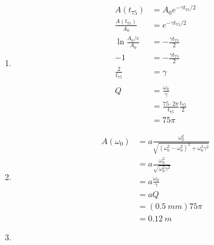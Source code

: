 \documentclass{article}
\begin{document}
\subsection{}

\begin{enumerate}
  \item

        \begin{align*}
          A(t_{75})               & = A_0 e^{-\gamma t_{75} / 2}                     \\
          \frac{A(t_{75})}{A_0}   & = e^{-\gamma t_{75} / 2}                         \\
          \ln \frac{A_0 / e}{A_0} & = -\frac{\gamma t_{75}}{2}                       \\
          -1                      & = -\frac{\gamma t_{75}}{2}                       \\
          \frac{2}{t_{75}}        & = \gamma                                         \\ \\
          Q                       & = \frac{\omega_0}{\gamma}                        \\
                                  & = \frac{75 \cdot 2 \pi}{t_{75}} \frac{t_{75}}{2} \\
                                  & = 75 \pi
        \end{align*}

  \item

        \begin{align*}
          A(\omega_0) & = a \frac{\omega_0^2}{\sqrt{(\omega_0^2  - \omega_0^2)^2 + \omega_0^2 \gamma^2}} \\
                      & = a \frac{\omega_0^2}{\sqrt{\omega_0^2 \gamma^2}}                                \\
                      & = a \frac{\omega_0}{\gamma}                                                      \\
                      & = a Q                                                                            \\
                      & = (\qty{0.5}{mm}) 75 \pi                                                         \\
                      & = \qty{0.12}{m}
        \end{align*}

  \item


\end{enumerate}
\end{document}
